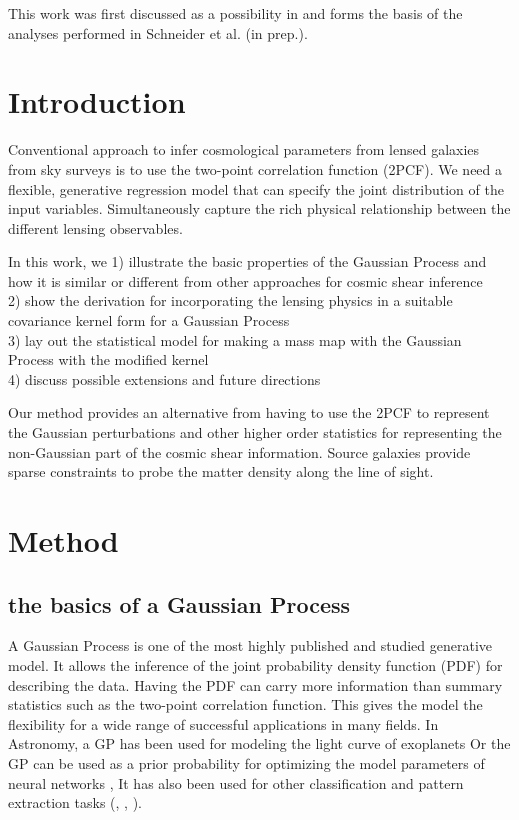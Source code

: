  
This work was first discussed as a possibility in  \citep{Schneider2014}  and 
forms the basis of the analyses performed in Schneider et al. (in prep.).

\section{Introduction} 
Conventional approach to infer cosmological parameters from lensed galaxies
from sky surveys is to use the two-point correlation function (2PCF).
We need a flexible, generative regression model 
that can specify the joint distribution of the input variables.
Simultaneously capture the rich  physical relationship between the different
lensing observables.  

In this work, we 
1) illustrate the basic properties of the Gaussian Process and how it is
similar or different from other approaches for cosmic shear inference  \\ 
2) show the derivation for incorporating the lensing physics in 
a suitable covariance kernel form for a Gaussian Process  \\
3) lay out the statistical model for making a mass map  
with the Gaussian Process with the modified kernel \\ 
4) discuss possible extensions and future directions 
 
Our method provides an alternative from having to use the 2PCF to represent the
Gaussian perturbations and other higher order
statistics for representing the non-Gaussian part of the cosmic shear information. 
Source galaxies provide sparse constraints to probe the matter density along
the line of sight. 

\section{Method}
\subsection{the basics of a Gaussian Process}
A Gaussian Process is one of the most highly published and studied 
generative model. It allows the inference of the joint probability density 
function (PDF) for describing the data. Having the PDF can carry more information 
than summary statistics such as the two-point correlation function.
This gives the model the flexibility for a wide range
of successful applications in many fields. 
In Astronomy, a GP has been used for modeling 
the light curve of exoplanets \citep{Ambikasaran2014a}
Or the GP can be used as a prior probability 
for optimizing the model parameters of
neural networks \citep{Snoek2012}, 
It has also been used for other classification and pattern extraction tasks 
(\citealt{Wilson2013}, \citealt{Duvenaud2013}, \citealt{Rasmussen2006}).
 

